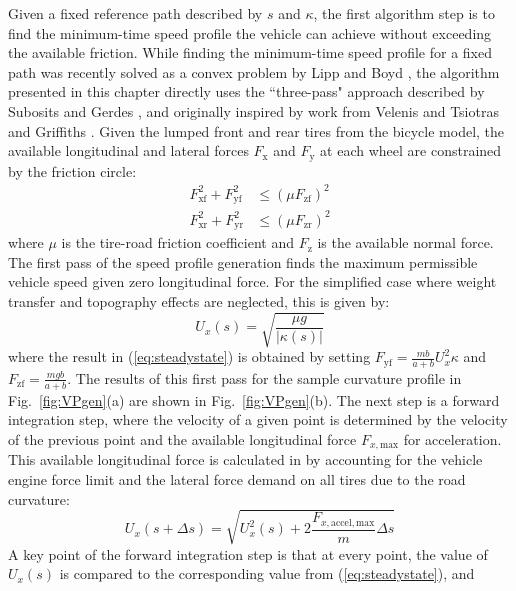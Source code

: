 Given a fixed reference path described by $s$ and $\kappa$, the first algorithm step is to find the 
minimum-time speed profile the vehicle can achieve
without exceeding the available friction. 
While finding the minimum-time speed profile for a fixed path was recently solved as a convex problem by Lipp and Boyd \cite{lipp}, the
 algorithm presented in this chapter directly uses the ``three-pass" approach described by 
Subosits and Gerdes \cite{subosits}, and originally inspired by work from Velenis and Tsiotras \cite{velenis}
and Griffiths \cite{griffiths}. 
Given the lumped front and rear tires from the bicycle model, the available longitudinal
 and lateral forces $F_\mathrm{x}$ and $F_\mathrm{y}$ at each wheel are constrained by the friction circle: 
\begin{subequations}
\label{eq:tireforce}
\begin{align}
	F^2_\mathrm{xf} + F_\mathrm{yf}^2 &\leq (\mu F_\mathrm{zf})^2\\
	F^2_\mathrm{xr} + F_\mathrm{yr}^2 &\leq (\mu F_\mathrm{zr})^2
\end{align}
\end{subequations}
where $\mu$ is the tire-road friction coefficient and $F_\mathrm{z}$ is the available normal force. The first pass of the speed profile generation finds the maximum permissible
 vehicle speed given zero longitudinal force. For the simplified case where weight transfer and topography effects are neglected, this is given by:
\begin{equation}
\label{eq:steadystate}
	U_x(s) = \sqrt{\frac{\mu g}{|\kappa(s)|}}
\end{equation}
where the result in (\ref{eq:steadystate}) is  obtained by setting $F_\mathrm{yf} = \frac{mb}{a+b}U_x^2\kappa$ and $F_\mathrm{zf} = \frac{mgb}{a+b}$.
 The results of this first pass for the sample curvature profile in Fig.~\ref{fig:VPgen}(a) are shown in Fig.~\ref{fig:VPgen}(b).
 The next step is a forward 
integration step, where the velocity of a given point is determined by the velocity of the previous point and the available longitudinal force $F_{x,\mathrm{max}}$ for acceleration.
This available longitudinal force is calculated in \cite{subosits} by accounting for the vehicle engine force limit and the lateral force demand on all tires due to the road curvature:
\begin{equation}
\label{eq:forwardint}
	U_x(s+\Delta s) =\sqrt{U^2_x(s)+\mathrm{2}\frac{F_{x,\mathrm{accel,max}}}{m}\Delta s}
\end{equation}
A key point of the forward integration step is that at every point, the value of $U_x(s)$ is compared to the corresponding value from (\ref{eq:steadystate}), and
